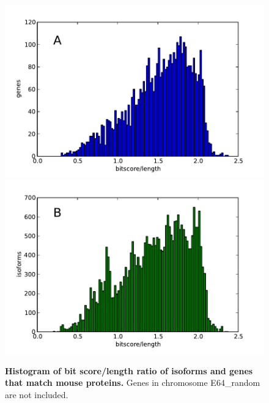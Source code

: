 \documentclass[10pt]{article}
\begin{document}
\begin{figure}[!ht]
\begin{center}
\includegraphics[width=5in]{genes_bitscore.pdf}
\includegraphics[width=5in]{isoforms_bitscore.pdf}
\end{center}
\caption{
{\bf Histogram of bit score/length ratio of isoforms and genes that match mouse proteins.}
Genes in chromosome E64\_random are not included.
}
\label{bitscore}
\end{figure}
\end{document}
